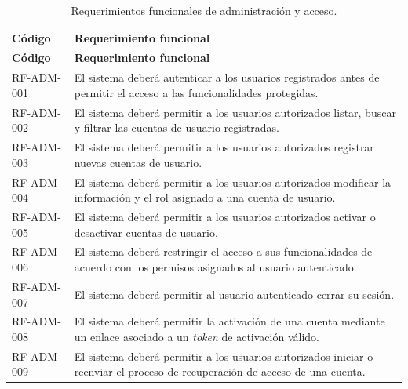 \begin{longtable}{|p{}|p{}|}
    \caption{Requerimientos funcionales de administración y acceso.}
    \label{tab:rf-adm}\\
    \hline
    \textbf{Código} & \textbf{Requerimiento funcional} \\
    \hline
    \endfirsthead

    \hline
    \textbf{Código} & \textbf{Requerimiento funcional} \\
    \hline
    \endhead

    RF-ADM-001 &
    El sistema deberá autenticar a los usuarios registrados antes de permitir
    el acceso a las funcionalidades protegidas. \\
    \hline

    RF-ADM-002 &
    El sistema deberá permitir a los usuarios autorizados listar, buscar y
    filtrar las cuentas de usuario registradas. \\
    \hline

    RF-ADM-003 &
    El sistema deberá permitir a los usuarios autorizados registrar nuevas
    cuentas de usuario. \\
    \hline

    RF-ADM-004 &
    El sistema deberá permitir a los usuarios autorizados modificar la
    información y el rol asignado a una cuenta de usuario. \\
    \hline

    RF-ADM-005 &
    El sistema deberá permitir a los usuarios autorizados activar o desactivar
    cuentas de usuario. \\
    \hline

    RF-ADM-006 &
    El sistema deberá restringir el acceso a sus funcionalidades de acuerdo
    con los permisos asignados al usuario autenticado. \\
    \hline

    RF-ADM-007 &
    El sistema deberá permitir al usuario autenticado cerrar su sesión. \\
    \hline

    RF-ADM-008 &
    El sistema deberá permitir la activación de una cuenta mediante un enlace
    asociado a un \textit{token} de activación válido. \\
    \hline

    RF-ADM-009 &
    El sistema deberá permitir a los usuarios autorizados iniciar o reenviar
    el proceso de recuperación de acceso de una cuenta. \\
    \hline


\end{longtable}
